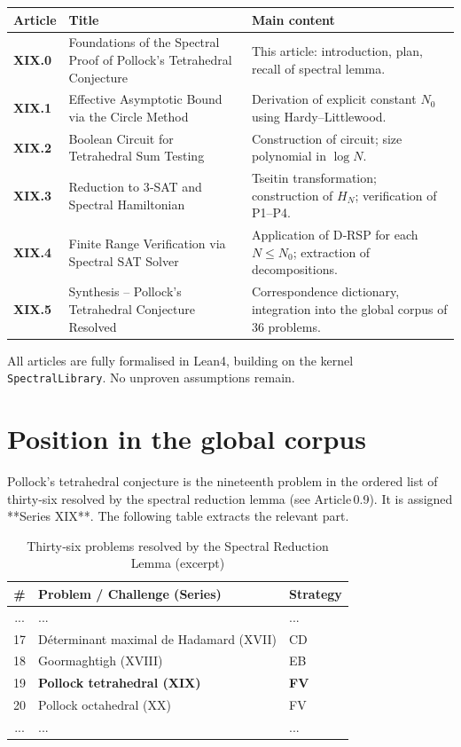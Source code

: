 \documentclass[11pt,a4paper]{article}
\begin{document}
\begin{center}
\small
\begin{tabular}{@{}>{\bfseries}l>{\raggedright\arraybackslash}p{4.5cm}>{\raggedright\arraybackslash}p{6cm}@{}}
\toprule
\textbf{Article} & \textbf{Title} & \textbf{Main content} \\
\midrule
XIX.0 & Foundations of the Spectral Proof of Pollock's Tetrahedral Conjecture & This article: introduction, plan, recall of spectral lemma. \\
XIX.1 & Effective Asymptotic Bound via the Circle Method & Derivation of explicit constant \(N_0\) using Hardy–Littlewood. \\
XIX.2 & Boolean Circuit for Tetrahedral Sum Testing & Construction of circuit; size polynomial in \(\log N\). \\
XIX.3 & Reduction to 3‑SAT and Spectral Hamiltonian & Tseitin transformation; construction of \(H_N\); verification of P1–P4. \\
XIX.4 & Finite Range Verification via Spectral SAT Solver & Application of D‑RSP for each \(N\le N_0\); extraction of decompositions. \\
XIX.5 & Synthesis – Pollock's Tetrahedral Conjecture Resolved & Correspondence dictionary, integration into the global corpus of 36 problems. \\
\bottomrule
\end{tabular}
\end{center}

All articles are fully formalised in Lean4, building on the kernel \texttt{SpectralLibrary}. No unproven assumptions remain.

\section{Position in the global corpus}

Pollock's tetrahedral conjecture is the nineteenth problem in the ordered list of thirty‑six resolved by the spectral reduction lemma (see Article 0.9). It is assigned **Series XIX**. The following table extracts the relevant part.

\begin{center}
\small
\begin{longtable}{@{}cll@{}}
\caption{Thirty‑six problems resolved by the Spectral Reduction Lemma (excerpt)}\\
\toprule
\# & Problem / Challenge (Series) & Strategy \\
\midrule
... & ... & ... \\
17 & Déterminant maximal de Hadamard (XVII) & CD \\
18 & Goormaghtigh (XVIII) & EB \\
19 & \textbf{Pollock tetrahedral (XIX)} & \textbf{FV} \\
20 & Pollock octahedral (XX) & FV \\
... & ... & ... \\
\bottomrule
\end{longtable}
\end{center}
\end{document}
